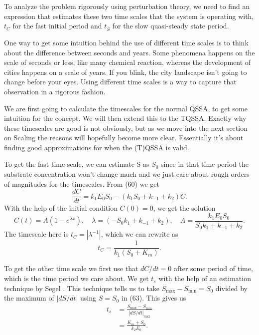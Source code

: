\documentclass[12pt]{article}
\begin{document}
To analyze the problem rigorously using perturbation theory, we need
to find an expression that estimates these two time scales that the
system is operating with, $t_C$ for the fast initial period and
$t_{\overline{S}}$ for the slow quasi-steady state period.

One way to get some intuition behind the use of different time scales
is to think about the difference between seconds and years. Some
phenomena happens on the scale of seconds or less, like many chemical
reaction, whereas the development of cities happens on a scale of
years. If you blink, the city landscape isn't going to change before
your eyes. Using different time scales is a way to capture that
observation in a rigorous fashion.

We are first going to calculate the timescales for the normal QSSA, to
get some intuition for the concept. We will then extend this to the
TQSSA. Exactly why these timescales are good is not obviously, but as
we move into the next section on Scaling the reasons will hopefully
become more clear. Essentially it's about finding good approximations
for when the (T)QSSA is valid.

To get the fast time scale, we can estimate S as $S_0$ since in that
time period the substrate concentration won't change much and we just
care about rough orders of magnitudes for the timescales. From (60) we
get
\begin{equation}
  \frac{dC}{dt} = k_1E_0 S_0 - (k_1 S_0 + k_{-1} + k_2)C.
\end{equation}
With the help of the initial condition $C(0)=0$, we get the solution
\begin{equation}
  C(t) = A(1 -  e^{\lambda x}), \quad
  \lambda = (-S_0 k_1 + k_{-1} + k_2), \quad
  A =\frac{k_1 E_0 S_0}{S_0 k_1 + k_{-1} + k_2}.
\end{equation}
The timescale here is $t_C = |\lambda^{-1}|$, which we can rewrite as
\begin{equation}
  t_C = \frac{1}{k_1(S_0+K_m)}.
\end{equation}

To get the other time scale we first use that $dC/dt = 0$ after some
period of time, which is the time period we care about. We get $t_s$
with the help of an estimation technique by Segel
\cite{segel1984modeling}. This technique tells us to take
$S_{\max} - S_{\min} = S_0$ divided by the maximum of $|dS/dt|$ using
$S=S_0$ in (63). This gives us
\begin{align}
  t_s &= \frac{S_{\max} - S_{\min}}{|dS/dt|_{\max}} \\
      &= \frac{K_m + S_0}{k_2 E_0}.
\end{align}
\end{document}
